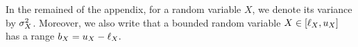 
%

%
\noindent In the remained of the appendix, for  a random variable $X$, we denote its variance  by $\sigma^2_X$.
Moreover, we also write that a bounded random variable
$X\in [\ell_X,u_X]$  has a range $b_X=u_X-\ell_X.$ 

%

%

%

%
%